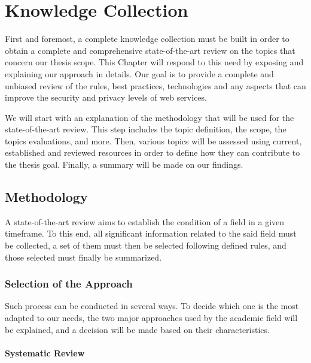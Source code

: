 \chapter{Knowledge Collection}
\label{chap:state}

First and foremost, a complete knowledge collection must be built in order to obtain a complete and comprehensive state-of-the-art review on the topics that concern our thesis scope. This Chapter will respond to this need by exposing and explaining our approach in details. Our goal is to provide a complete and unbiased review of the rules, best practices, technologies and any aspects that can improve the security and privacy levels of web services.

We will start with an explanation of the methodology that will be used for the state-of-the-art review. This step includes the topic definition, the scope, the topics evaluations, and more. Then, various topics will be assessed using current, established and reviewed resources in order to define how they can contribute to the thesis goal. Finally, a summary will be made on our findings.

\minitoc

\newpage

\section{Methodology}
\label{sec:state_methodology}

A state-of-the-art review aims to establish the condition of a field in a given timeframe. To this end, all significant information related to the said field must be collected, a set of them must then be selected following defined rules, and those selected must finally be summarized.

\subsection{Selection of the Approach}
\label{sec:state_methodology_approach}

Such process can be conducted in several ways. To decide which one is the most adapted to our needs, the two major approaches used by the academic field will be explained, and a decision will be made based on their characteristics.

\subsubsection{Systematic Review}
\label{sec:state_methodology_approach_systemic}

